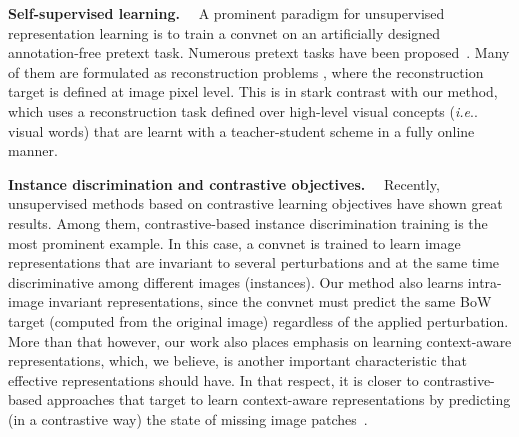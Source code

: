 \documentclass[final]{cvpr}
\makeatletter
\newcommand{\parag}[1]{\smallskip\noindent\textbf{#1}~~}
\DeclareRobustCommand\onedot{\futurelet\@let@token\@onedot}
\def\@onedot{\ifx\@let@token.\else.\null\fi\xspace}
\def\ie{\emph{i.e}\onedot} \def\Ie{\emph{I.e}\onedot}
\makeatother
\begin{document}
\parag{Self-supervised learning.}
A prominent paradigm for unsupervised representation learning is to train a convnet on an artificially designed annotation-free pretext task. 
Numerous pretext tasks have been proposed~\cite{arandjelovic2017look, chen2019self, doersch2015unsupervised, gidaris2018unsupervised, lee2017unsupervised,misra2016shuffle, noroozi2016unsupervised,vondrick2018tracking, wei2018learning, zhang2019aet, zhou2017unsupervised}.  
Many of them are formulated as reconstruction problems 
\cite{alayrac2019visual, godard2017unsupervised, larsson2016learning, pathak2016context, pillai2019superdepth, vincent2008extracting, zhang2016colorful, zhang2017split, zhou2017unsupervised}, 
where the reconstruction target is defined at image pixel level.
This is in stark contrast with our method, which uses a reconstruction task defined over high-level visual concepts (\ie visual words) that are learnt with a teacher-student scheme in a fully online manner.

\parag{Instance discrimination and contrastive objectives.}
Recently, unsupervised methods based on contrastive learning objectives 
\cite{caron2020unsupervised,chen2020simple,falcon2020framework,frankle2020all,he2020momentum,henaff2020data,jaiswal2020survey,misra2020self,oord2018representation,tian2020contrastive,wang2020understanding,wu2018unsupervised} 
have shown great results. 
Among them, contrastive-based instance discrimination training \cite{chen2020simple,dosovitskiy2015discriminative,he2020momentum,kalantidis2020hard,wu2018unsupervised} is the most prominent example.
In this case, a convnet is trained to learn image representations that are invariant to several perturbations and at the same time discriminative among different images (instances). 
Our method also learns intra-image invariant representations, since the convnet must predict the same BoW target (computed from the original image) regardless of the applied perturbation.
More than that however, our work also places emphasis on learning context-aware representations, which, we believe, is another important characteristic that effective representations should have.
In that respect, it is closer to contrastive-based approaches that target to learn context-aware representations by predicting (in a contrastive way) the state of missing image patches~\cite{henaff2020data,oord2018representation,trinh2019selfie}.
\end{document}
